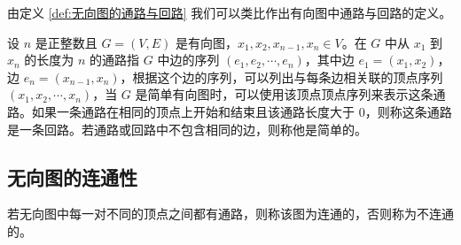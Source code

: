 \documentclass[lang=cn, thmcnt=section, chinesefont=founder, color=cyan, citestyle=gb7714-2015, bibstyle=gb7714-2015]{elegantbook}
\begin{document}
由定义 \ref{def:无向图的通路与回路} 我们可以类比作出有向图中通路与回路的定义。

\begin{definition}[有向图的通路与回路]\label{def:有向图的通路与回路}
    设 $n$ 是正整数且 $G=(V,E)$ 是有向图，$x_1,x_2,x_{n-1},x_n \in V$。在 $G$ 中从 $x_1$ 到 $x_n$ 的长度为 $n$ 的通路指 $G$ 中边的序列 $(e_1,e_2,\cdots,e_n)$，其中边 $e_1 = (x_1,x_2)$，边 $e_n = (x_{n-1},x_n)$，根据这个边的序列，可以列出与每条边相关联的顶点序列 $(x_1,x_2,\cdots,x_n)$，当 $G$ 是简单有向图时，可以使用该顶点顶点序列来表示这条通路。如果一条通路在相同的顶点上开始和结束且该通路长度大于 $0$，则称这条通路是一条回路。若通路或回路中不包含相同的边，则称他是简单的。
\end{definition}



\subsection{无向图的连通性}
\begin{definition}[无向图的连通性]\label{def:无向图的连通性}
    若无向图中每一对不同的顶点之间都有通路，则称该图为连通的，否则称为不连通的。
\end{definition}
\end{document}
